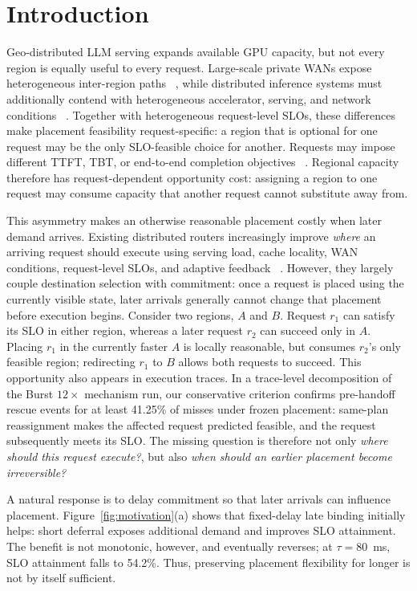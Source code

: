 \section{Introduction}
\label{sec:introduction}

Geo-distributed LLM serving expands available GPU capacity, but not every
region is equally useful to every request.
Large-scale private WANs expose heterogeneous inter-region paths
~\cite{b4,swan}, while distributed inference systems must additionally contend
with heterogeneous accelerator, serving, and network conditions
~\cite{helix,cassini,skylb,gorgo,solyx}.
Together with heterogeneous request-level SLOs, these differences make
placement feasibility request-specific: a region that is optional for one
request may be the only SLO-feasible choice for another.
Requests may impose different TTFT, TBT, or end-to-end completion objectives
~\cite{distserve,jitserve,quartz,andes,revisit_slo_goodput}.
Regional capacity therefore has request-dependent opportunity cost: assigning
a region to one request may consume capacity that another request cannot
substitute away from.

This asymmetry makes an otherwise reasonable placement costly when later demand
arrives.
Existing distributed routers increasingly improve \emph{where} an arriving
request should execute using serving load, cache locality, WAN conditions,
request-level SLOs, and adaptive feedback
~\cite{preble,dualmap,skylb,gorgo,quartz,lodestar}.
However, they largely couple destination selection with commitment: once a
request is placed using the currently visible state, later arrivals generally
cannot change that placement before execution begins.
Consider two regions, $A$ and $B$.
Request $r_1$ can satisfy its SLO in either region, whereas a later request
$r_2$ can succeed only in $A$.
Placing $r_1$ in the currently faster $A$ is locally reasonable, but consumes
$r_2$'s only feasible region; redirecting $r_1$ to $B$ allows both requests to
succeed.
This opportunity also appears in execution traces.
In a trace-level decomposition of the Burst $12\times$ mechanism run, our
conservative criterion confirms pre-handoff rescue events for at least
41.25\% of misses under frozen placement: same-plan reassignment makes the
affected request predicted feasible, and the request subsequently meets its
SLO.
The missing question is therefore not only
\emph{where should this request execute?}, but also
\emph{when should an earlier placement become irreversible?}

A natural response is to delay commitment so that later arrivals can influence
placement.
Figure~\ref{fig:motivation}(a) shows that fixed-delay late binding initially
helps: short deferral exposes additional demand and improves SLO attainment.
The benefit is not monotonic, however, and eventually reverses; at
$\tau=80$~ms, SLO attainment falls to 54.2\%.
Thus, preserving placement flexibility for longer is not by itself sufficient.


